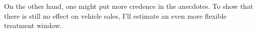 \documentclass[11pt,letterpaper,oneside]{article}
\newcommand{\Var}{\text{Var}}
\begin{document}
\begin{doublespacing}
%

%

On the other hand, one might put more credence in the anecdotes.
To show that there is still no effect on vehicle sales, I'll estimate an even more flexible treatment window.





\end{doublespacing}
\end{document}
